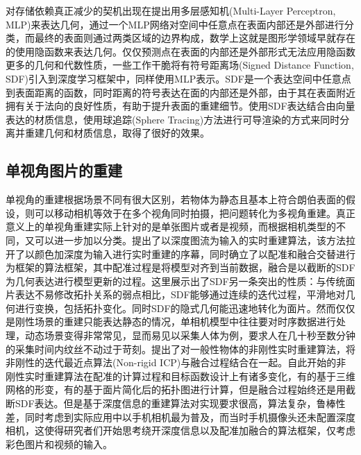 对存储依赖真正减少的契机出现在\citet{meshcheder2019cvpr}提出用多层感知机(Multi-Layer Perceptron, MLP)来表达几何，通过一个MLP网络对空间中任意点在表面内部还是外部进行分类，而最终的表面则通过两类区域的边界构成，数学上这就是图形学领域早就存在的使用隐函数来表达几何。仅仅预测点在表面的内部还是外部形式无法应用隐函数更多的几何和代数性质，一些工作干脆将有符号距离场(Signed Distance Function, SDF)引入到深度学习框架中\citep{jiang2020sdfdiff, park2019cvpr}，同样使用MLP表示。SDF是一个表达空间中任意点到表面距离的函数，同时距离的符号表达在面的内部还是外部，由于其在表面附近拥有关于法向的良好性质，有助于提升表面的重建细节。\citet{yariv2020multiview}使用SDF表达结合由向量表达的材质信息，使用球追踪(Sphere Tracing)方法进行可导渲染的方式来同时分离并重建几何和材质信息，取得了很好的效果。

\subsection{单视角图片的重建}
单视角的重建根据场景不同有很大区别，若物体为静态且基本上符合朗伯表面的假设，则可以移动相机等效于在多个视角同时拍摄，把问题转化为多视角重建。真正意义上的单视角重建实际上针对的是单张图片或者是视频，而根据相机类型的不同，又可以进一步加以分类。\citet{newcombe2011kfuse}提出了以深度图流为输入的实时重建算法，该方法拉开了以颜色加深度为输入进行实时重建的序幕，同时确立了以配准和融合交替进行为框架的算法框架，其中配准过程是将模型对齐到当前数据，融合是以截断的SDF为几何表达进行模型更新的过程。这里展示出了SDF另一条突出的性质：与传统面片表达不易修改拓扑关系的弱点相比，SDF能够通过连续的迭代过程，平滑地对几何进行变换，包括拓扑变化。同时SDF的隐式几何能迅速地转化为面片\citep{lorensen1987}。然而仅仅是刚性场景的重建只能表达静态的情况，单相机模型中往往要对时序数据进行处理，动态场景变得非常常见，显而易见以采集人体为例，要求人在几十秒至数分钟的采集时间内纹丝不动过于苛刻。\citet{zollhofer2014}提出了对一般性物体的非刚性实时重建算法，将非刚性的迭代最近点算法(Non-rigid ICP)与融合过程结合在一起。自此开始的非刚性实时重建算法在配准的计算过程和目标函数设计上有诸多变化\citep{slavcheva2017, dou2016, innmann2016volume, newcombe2015}，有的基于三维网格的形变，有的基于面片简化后的拓扑图进行计算，但是融合过程始终还是用截断SDF表达。但是基于深度信息的重建算法对实现要求很高，算法复杂，鲁棒性差，同时考虑到实际应用中以手机相机最为普及，而当时手机摄像头还未配置深度相机，这使得研究者们开始思考绕开深度信息以及配准加融合的算法框架，仅考虑彩色图片和视频的输入。

